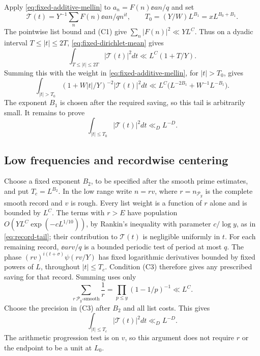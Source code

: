 Apply \eqref{eq:fixed-additive-mellin} to
\(a_n=F(n)\ee{an/q}\) and set
\[
 \mathcal T(t)=Y^{-1}\sum_nF(n)\ee{an/q}n^{it},\qquad
 T_0=(Y/W)L^{B_1}=xL^{B_0+B_1}.
\]
The pointwise list bound and \textup{(C1)} give
\(\sum_n|F(n)|^2\ll YL^C\). Thus on a dyadic interval
\(T\le |t|\le2T\), \eqref{eq:fixed-dirichlet-mean} gives
\[
 \int_{T\le|t|\le2T}|\mathcal T(t)|^2dt
                                  \ll L^C(1+T/Y).
\]
Summing this with the weight in
\eqref{eq:fixed-additive-mellin}, for \(|t|>T_0\), gives
\begin{equation}\label{eq:fixed-frequency-tail}
 \int_{|t|>T_0}(1+W|t|/Y)^{-2}|\mathcal T(t)|^2dt
       \ll L^C\bigl(L^{-2B_1}+W^{-1}L^{-B_1}\bigr).
\end{equation}
The exponent \(B_1\) is chosen after the required saving, so this
tail is arbitrarily small. It remains to prove
\begin{equation}\label{eq:fixed-dirichlet-energy}
                \int_{|t|\le T_0}|\mathcal T(t)|^2dt\ll_D L^{-D}.
\end{equation}

\subsection{Low frequencies and recordwise centering}

Choose a fixed exponent \(B_2\), to be specified after the smooth
prime estimates, and put \(T_c=L^{B_2}\). In the low range write
\(n=rv\), where \(r=n_{\mathcal P_y}\) is the complete smooth record and
\(v\) is rough. Every list weight is a function of \(r\) alone
and is bounded by \(L^C\). The terms with \(r>E\) have population
\(O(YL^C\exp(-cL^{1/10}))\), by Rankin's inequality with parameter
\(c/\log y\), as in \eqref{eq:record-tail}; their contribution to
\(\mathcal T(t)\)
is negligible uniformly in \(t\). For each remaining record,
\(\ee{arv/q}\) is a bounded periodic test of period at most \(q\).
The phase \((rv)^{i(t+\sigma)}\psi(rv/Y)\) has fixed logarithmic
derivatives bounded by fixed powers of \(L\), throughout
\(|t|\le T_c\). Condition \textup{(C3)} therefore gives any
prescribed saving for that record. Summing uses only
\[
          \sum_{r\ \mathcal P_y\text{-smooth}}\frac1r
             =\prod_{p\le y}(1-1/p)^{-1}\ll L^C.
\]
Choose the precision in \textup{(C3)} after \(B_2\) and all list
costs. This gives
\begin{equation}\label{eq:fixed-low}
             \int_{|t|\le T_c}|\mathcal T(t)|^2dt\ll_D L^{-D}.
\end{equation}
The arithmetic progression test is on \(v\), so this argument
does not require \(r\) or the endpoint to be a unit at \(L_0\).

